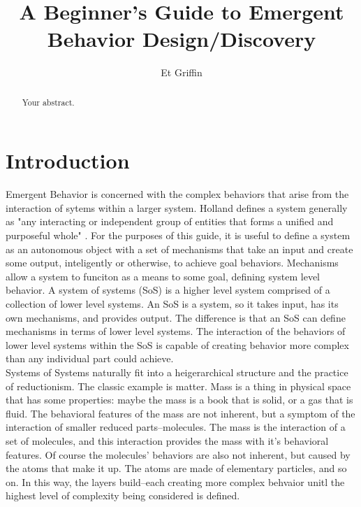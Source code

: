 \documentclass{article}
\title{A Beginner's Guide to Emergent Behavior Design/Discovery}
\author{Et Griffin}
\begin{document}
\maketitle

\begin{abstract}
Your abstract.
\end{abstract}

\section{Introduction}
Emergent Behavior is concerned with the complex behaviors that arise from the interaction of sytems within a larger system. Holland defines a system generally as "any interacting or  independent group of entities that forms a unified and purposeful whole" \cite{RealWorld}.
For the purposes of this guide, it is useful to define a system as an autonomous object with a set of mechanisms that take an input and create some output, inteligently or otherwise, to achieve goal behaviors. 
Mechanisms allow a system to funciton as a means to some goal, defining system level behavior. A system of systems (SoS) is a higher level system comprised of a collection of lower level systems. An SoS is a system, so it takes input, has its own mechanisms, and provides output. The difference is that an SoS can define mechanisms in terms of lower level systems.
The interaction of the behaviors of lower level systems within the SoS is capable of creating behavior more complex than any individual part could achieve.\\
Systems of Systems naturally fit into a heigerarchical structure and the practice of reductionism. 
The classic example is matter.
Mass is a thing in physical space that has some properties: maybe the mass is a book that is solid, or a gas that is fluid. The behavioral features of the mass are not inherent, but a symptom of the interaction of smaller reduced parts--molecules. 
The mass is the interaction of a set of molecules, and this interaction provides the mass with it's behavioral features. Of course the molecules' behaviors are also not inherent, but caused by the atoms that make it up. 
The atoms are made of elementary particles, and so on. In this way, the layers build--each creating more complex behvaior unitl the highest level of complexity being considered is defined.
\end{document}
